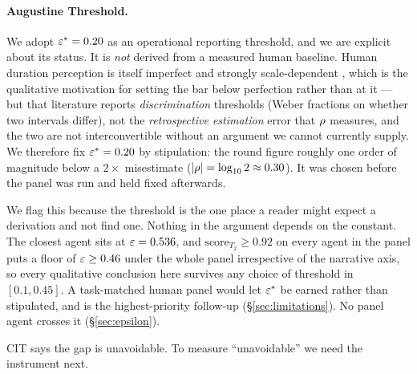\paragraph{Augustine Threshold.} We adopt $\varepsilon^{*} = 0.20$ as an operational reporting threshold, and we are explicit about its status. It is \emph{not} derived from a measured human baseline. Human duration perception is itself imperfect and strongly scale-dependent \citep{wittmann2009chronoception,eagleman2008time}, which is the qualitative motivation for setting the bar below perfection rather than at it --- but that literature reports \emph{discrimination} thresholds (Weber fractions on whether two intervals differ), not the \emph{retrospective estimation} error that $\rho$ measures, and the two are not interconvertible without an argument we cannot currently supply. We therefore fix $\varepsilon^{*} = 0.20$ by stipulation: the round figure roughly one order of magnitude below a $2\times$ misestimate ($|\rho| = \log_{10} 2 \approx 0.30$). It was chosen before the panel was run and held fixed afterwards.

We flag this because the threshold is the one place a reader might expect a derivation and not find one. Nothing in the argument depends on the constant. The closest agent sits at $\varepsilon = 0.536$, and $\mathrm{score}_{T_2} \geq 0.92$ on every agent in the panel puts a floor of $\varepsilon \geq 0.46$ under the whole panel irrespective of the narrative axis, so every qualitative conclusion here survives any choice of threshold in $[0.1, 0.45]$. A task-matched human panel would let $\varepsilon^{*}$ be earned rather than stipulated, and is the highest-priority follow-up (\S\ref{sec:limitations}). No panel agent crosses it (\S\ref{sec:epsilon}).

CIT says the gap is unavoidable. To measure ``unavoidable'' we need the instrument next.
